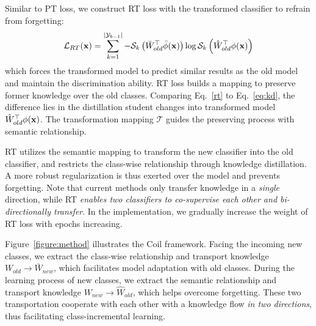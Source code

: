 \documentclass[sigconf]{acmart}
\newcommand{\x}{{\bf x}}
\newcommand{\T}{\mathcal{T}}
\newcommand{\name}{{\sc Coil }}
\begin{document}
 Similar to PT loss, we construct RT loss with the transformed classifier to refrain from forgetting:
\begin{align} \label{rt}
	\mathcal{L}_{RT}(\mathbf{x}) = \sum_{k=1}^{|\mathcal{Y}_{b-1}|}-
	\mathcal{S}_k\left({\bar{W}_{old}^{\top}\bar{\phi}(\x)}\right)
	\log \mathcal{S}_k\left({\hat{W}_{old}^{\top}\phi(\x)}\right)  
\end{align}
which forces the transformed model to predict similar results as  the old model and maintain the discrimination ability. RT loss builds a mapping to preserve former knowledge over the old classes. Comparing Eq.~\ref{rt} to Eq.~\ref{eq:kd}, the difference lies in the distillation student changes into transformed model $\hat{W}_{old}^{\top}\phi(\x)$. The transformation mapping $\T$ guides the preserving process with semantic relationship.

 RT utilizes the semantic mapping to transform the new classifier into the old classifier, and restricts the class-wise relationship through knowledge distillation. A more robust regularization is thus exerted over the model and prevents forgetting. Note that current methods only transfer knowledge in a \emph{single} direction, while RT \emph{enables two classifiers to co-supervise each other and bi-directionally transfer}.
In the implementation, we gradually increase the weight of RT loss with epochs increasing. 

 Figure~\ref{figure:method} illustrates the \name framework. Facing the incoming new classes, we extract the class-wise relationship and transport knowledge  $W_{old}\rightarrow \bar{W}_{new}$, which facilitates model adaptation with old classes. During the learning process of new classes, we extract the semantic relationship and transport knowledge  ${W}_{new}\rightarrow \hat{W}_{old}$, which helps overcome forgetting. These two transportation cooperate with each other with a knowledge flow \emph{in two directions}, thus  facilitating class-incremental learning. 
\end{document}
